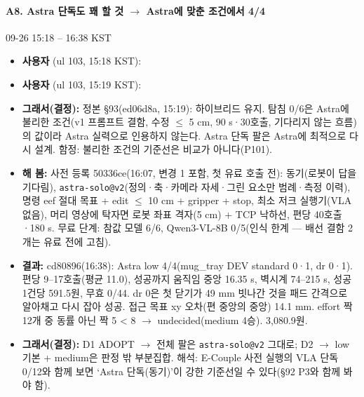 \paragraph{A8. Astra 단독도 꽤 할 것 $\rightarrow$ Astra에 맞춘 조건에서 4/4}
{\small 09-26 15:18 -- 16:38 KST}
\begin{itemize}
  \item \textbf{사용자} (ul 103, 15:18 KST): 
  \item \textbf{사용자} (ul 103, 15:19 KST): 
  \item \textbf{그래서(결정):} 정본 §93(ed06d8a, 15:19): 하이브리드 유지. 탐침 0/6은 Astra에 불리한 조건(v1 프롬프트 결함, 수정 $\leq$ 5 cm, 90 s·30호출, 기다리지 않는 흐름)의 값이라 Astra 실력으로 인용하지 않는다. Astra 단독 팔은 Astra에 최적으로 다시 설계. 함정: 불리한 조건의 기준선은 비교가 아니다(P101).
  \item \textbf{해 봄:} 사전 등록 50336ce(16:07, 변경 1 포함, 첫 유료 호출 전): 동기(로봇이 답을 기다림), \texttt{astra-\allowbreak{}solo@v2}(정의·축·카메라 자세·그린 요소만 범례·측정 이력), 명령 eef 절대 목표 + edit $\leq$ 10 cm + gripper + stop, 최소 저크 실행기(VLA 없음), 머리 영상에 탁자면 로봇 좌표 격자(5 cm) + TCP 낙하선, 편당 40호출·180 s. 무료 단계: 참값 모델 6/6, Qwen3-VL-8B 0/5(인식 한계 --- 배선 결함 2개는 유료 전에 고침).
  \item \textbf{결과:} cd80896(16:38): Astra low 4/4(mug\_tray DEV standard 0·1, dr 0·1). 편당 9--17호출(평균 11.0), 성공까지 움직임 중앙 16.35 s, 벽시계 74--215 s, 성공 1건당 591.5원, 무효 0/44. dr 0은 첫 닫기가 49 mm 빗나간 것을 패드 간격으로 알아채고 다시 잡아 성공. 접근 목표 xy 오차(편 중앙의 중앙) 14.1 mm. effort 짝 12개 중 동률 아닌 짝 5 < 8 $\rightarrow$ undecided(medium 4승). 3,080.9원.
  \item \textbf{그래서(결정):} D1 ADOPT $\rightarrow$ 전체 팔은 \texttt{astra-\allowbreak{}solo@v2} 그대로; D2 $\rightarrow$ low 기본 + medium은 판정 밖 부분집합. 해석: E-Couple 사전 실행의 VLA 단독 0/12와 함께 보면 `Astra 단독(동기)'이 강한 기준선일 수 있다(§92 P3와 함께 봐야 함).
\end{itemize}

